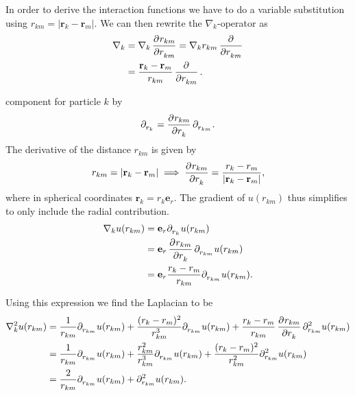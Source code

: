 \documentclass[
    a4paper, aps, twocolumn, floatfix, superscriptaddress]{revtex4-1}
\newcommand{\vf}{\mathbf}
\newcommand{\1}{\mathds{1}}
\newcommand{\tpl}[1]{\tensor{\partial}{_#1}} %
\begin{document}
            In order to derive the interaction functions we have to do a
            variable substitution using $r_{km} = |\vf{r}_k - \vf{r}_m|$. We can
            then rewrite the $\nabla_k$-operator as
            \begin{align}
                \nabla_k
                &=
                \nabla_k
                \dpd[]{r_{km}}{r_{km}}
                =
                \nabla_k r_{km} \dpd[]{}{r_{km}}
                \\
                &=
                \frac{\vf{r}_k - \vf{r}_m}{r_{km}}\dpd[]{}{r_{km}}.
            \end{align}

            component for particle $k$ by
            \begin{align}
                \tpl{{r_k}}
                = \dpd[]{r_{km}}{r_k}\tpl{{r_{km}}}.
            \end{align}
            The derivative of the distance $r_{km}$ is given by
            \begin{gather}
                r_{km} = |\vf{r}_k - \vf{r}_m|
                \implies
                \dpd[]{r_{km}}{r_k}
                = \frac{r_k - r_m}{|\vf{r}_k - \vf{r}_m|},
            \end{gather}
            where in spherical coordinates $\vf{r}_k = r_k\vf{e}_r$.  The
            gradient of $u(r_{km})$ thus simplifies to only include the radial
            contribution.
            \begin{align}
                \nabla_k u(r_{km})
                &=
                \vf{e}_{r}\tpl{{r_k}}u(r_{km})
                \\
                &=
                \vf{e}_r\dpd[]{r_{km}}{r_k}\tpl{{r_{km}}}u(r_{km})
                \\
                &= \vf{e}_r\frac{r_k - r_m}{r_{km}}
                \tpl{{r_{km}}}u(r_{km}).
            \end{align}
            \begin{widetext}
                Using this expression we find the Laplacian to be
                \begin{align}
                    \nabla_k^2 u(r_{km})
                    &=
                    \frac{1}{r_{km}} \tpl{{r_{km}}} u(r_{km})
                    + \frac{(r_k - r_m)^2}{r_{km}^3} \tpl{{r_{km}}} u(r_{km})
                    +
                    \frac{r_k - r_m}{r_{km}}
                    \dpd[]{r_{km}}{r_k}
                    \partial_{{r_{km}}}^2 u(r_{km}) \\
                    &=
                    \frac{1}{r_{km}} \tpl{{r_{km}}} u(r_{km})
                    + \frac{r_{km}^2}{r_{km}^3} \tpl{{r_{km}}} u(r_{km})
                    +
                    \frac{(r_k - r_m)^2}{r_{km}^2}
                    \partial_{{r_{km}}}^2 u(r_{km}) \\
                    &=
                    \frac{2}{r_{km}}\tpl{{r_{km}}}u(r_{km})
                    + \partial_{{r_{km}}}^2u(r_{km}).
                \end{align}
            \end{widetext}
\end{document}
